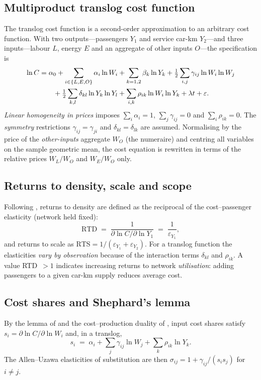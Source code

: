 \documentclass[11pt,a4paper]{article}
\begin{document}
\subsection{Multiproduct translog cost function}
The translog cost function \citep{cjl1973} is a second-order approximation
to an arbitrary cost function. With two outputs---passengers $Y_1$ and
service car-km $Y_2$---and three inputs---labour $L$, energy $E$ and an
aggregate of other inputs $O$---the specification is
\begin{align}
\ln C &= \alpha_0 + \sum_{i\in\{L,E,O\}} \alpha_i \ln W_i
         + \sum_{k=1,2} \beta_k \ln Y_k
         + \tfrac{1}{2}\sum_{i,j} \gamma_{ij}\ln W_i \ln W_j \notag\\
      &\qquad + \tfrac{1}{2}\sum_{k,l} \delta_{kl}\ln Y_k \ln Y_l
         + \sum_{i,k} \rho_{ik}\ln W_i \ln Y_k + \lambda t + \varepsilon.
\label{eq:translog}
\end{align}
\emph{Linear homogeneity in prices} imposes $\sum_i \alpha_i = 1$,
$\sum_j \gamma_{ij}=0$ and $\sum_i \rho_{ik}=0$. The \emph{symmetry}
restrictions $\gamma_{ij}=\gamma_{ji}$ and $\delta_{kl}=\delta_{lk}$ are
assumed. Normalising by the price of the \emph{other-inputs} aggregate
$W_O$ (the numeraire) and centring all variables on the sample geometric
mean, the cost equation is rewritten in terms of the relative prices
$W_L/W_O$ and $W_E/W_O$ only.

\subsection{Returns to density, scale and scope}
Following \citet{caves1984}, returns to density are defined as the
reciprocal of the cost--passenger elasticity (network held fixed):
\begin{equation}
\text{RTD} \;=\; \frac{1}{\partial \ln C / \partial \ln Y_1}
       \;=\; \frac{1}{\varepsilon_{Y_1}} ,
\label{eq:rtd}
\end{equation}
and returns to scale as $\text{RTS}=1/(\varepsilon_{Y_1}+\varepsilon_{Y_2})$.
For a translog function the elasticities \emph{vary by observation}
because of the interaction terms $\delta_{kl}$ and $\rho_{ik}$. A value
RTD~$>1$ indicates increasing returns to network \emph{utilisation}:
adding passengers to a given car-km supply reduces average cost.

\subsection{Cost shares and Shephard's lemma}
By the lemma of \citet{shephard1953} and the cost--production duality of
\citet{diewert1971}, input cost shares satisfy
$s_i = \partial \ln C / \partial \ln W_i$ and, in a translog,
\begin{equation}
s_i \;=\; \alpha_i + \sum_j \gamma_{ij}\ln W_j + \sum_k \rho_{ik} \ln Y_k .
\end{equation}
The Allen--Uzawa elasticities of substitution \citep{uzawa1962} are then
$\sigma_{ij} = 1 + \gamma_{ij}/(s_i s_j)$ for $i\neq j$.
\end{document}
